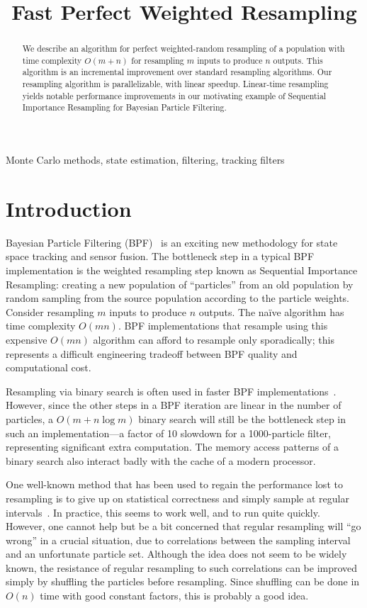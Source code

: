 \documentclass{article}
\title{Fast Perfect Weighted Resampling}
\begin{document}
\maketitle
%
\begin{abstract}
  We describe an algorithm for perfect weighted-random
  resampling of a population with time complexity $O(m +
  n)$ for resampling $m$ inputs to produce $n$ outputs.
  This algorithm is an incremental improvement over
  standard resampling algorithms.  Our resampling
  algorithm is parallelizable, with linear speedup.
  Linear-time resampling yields notable performance
  improvements in our motivating example of Sequential
  Importance Resampling for Bayesian
  Particle Filtering.
\end{abstract}
%
\begin{keywords}
Monte Carlo methods, state estimation, filtering, tracking filters
\end{keywords}
%
\section{Introduction}

  Bayesian Particle Filtering (BPF)~\cite{bpf} is an exciting
  new methodology for state space tracking and sensor
  fusion.  The bottleneck step in a typical BPF
  implementation is the weighted resampling step known as
  Sequential Importance Resampling: creating a new
  population of ``particles'' from an old population by
  random sampling from the source population according to
  the particle weights.  Consider resampling $m$ inputs to
  produce $n$ outputs.  The na\"ive algorithm has time
  complexity $O(mn)$.  BPF implementations that resample
  using this expensive $O(mn)$ algorithm can afford to
  resample only sporadically; this represents a difficult
  engineering tradeoff between BPF quality and computational
  cost.

  Resampling via binary search is often used in faster BPF
  implementations~\cite{arulampalam02tutorial}.  However,
  since the other steps in a BPF iteration are linear in the
  number of particles, a $O(m + n \log m)$ binary search
  will still be the bottleneck step in such an
  implementation---a factor of 10 slowdown for a 1000-particle
  filter, representing significant extra computation.  The
  memory access patterns of a binary search also interact
  badly with the cache of a modern processor.

  One well-known method that has been used to regain the
  performance lost to resampling is to give up on
  statistical correctness and simply sample at regular
  intervals~\cite{kitagawa}.  In practice, this seems to
  work well, and to run quite quickly.  However, one cannot
  help but be a bit concerned that regular resampling will
  ``go wrong'' in a crucial situation, due to correlations
  between the sampling interval and an unfortunate particle
  set.  Although the idea does not seem to be widely known,
  the resistance of regular resampling to such correlations
  can be improved simply by shuffling the particles before
  resampling.  Since shuffling can be done in $O(n)$ time
  with good constant factors, this is probably a good idea.
\end{document}
